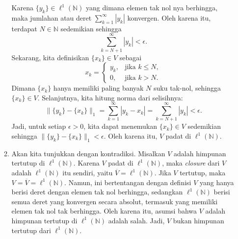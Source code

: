 \documentclass[11pt,letterpaper]{article}
\begin{document}
\begin{enumerate}
\begin{enumerate}
\[                \]
                Karena $\{y_k\} \in \ell^1(\mathbb{N})$ yang dimana elemen tak nol nya berhingga, maka jumlahan atau deret $\sum_{k=1}^{\infty} |y_k|$ konvergen. Oleh karena itu, terdapat $N \in \mathbb{N}$ sedemikian sehingga
                \[
                  \sum_{k=N+1}^{\infty} |y_k| < \epsilon.
                \]
                Sekarang, kita definisikan $\{x_k\} \in V$ sebagai
                \[
                  x_k = \begin{cases}
                    y_k, & \text{jika } k \leq N, \\
                    0,   & \text{jika } k > N.
                  \end{cases}
                \]
                Dimana $\{x_k\}$ hanya memiliki paling banyak $N$ suku tak-nol, sehingga $\{x_k\} \in V$. Selanjutnya, kita hitung norma dari selisihnya:
                \[
                  \|\{y_k\} - \{x_k\}\|_1 = \sum_{k=1}^{\infty} |y_k - x_k| = \sum_{k=N+1}^{\infty} |y_k| < \epsilon.
                \]
                Jadi, untuk setiap $\epsilon > 0$, kita dapat menemukan $\{x_k\} \in V$ sedemikian sehingga $\|\{y_k\} - \{x_k\}\|_1 < \epsilon$. Oleh karena itu, $V$ padat di $\ell^1(\mathbb{N})$.
          \item Akan kita tunjukkan dengan kontradiksi. Misalkan $V$ adalah himpunan tertutup di $\ell^1(\mathbb{N})$. Karena $V$ padat di $\ell^1(\mathbb{N})$, maka \textit{closure} dari $V$ adalah $\ell^1(\mathbb{N})$ itu sendiri, yaitu $\overline{V} = \ell^1(\mathbb{N})$. Jika $V$ tertutup, maka $V = \overline{V} = \ell^1(\mathbb{N})$. Namun, ini bertentangan dengan definisi $V$ yang hanya berisi deret dengan elemen tak nol berhingga, sedangkan $\ell^1(\mathbb{N})$ berisi semua deret yang konvergen secara absolut, termasuk yang memiliki elemen tak nol tak berhingga. Oleh karena itu, asumsi bahwa $V$ adalah himpunan tertutup di $\ell^1(\mathbb{N})$ adalah salah. Jadi, $V$ bukan himpunan tertutup dari $\ell^1(\mathbb{N})$.
        \end{enumerate}
\end{enumerate}
\end{document}
